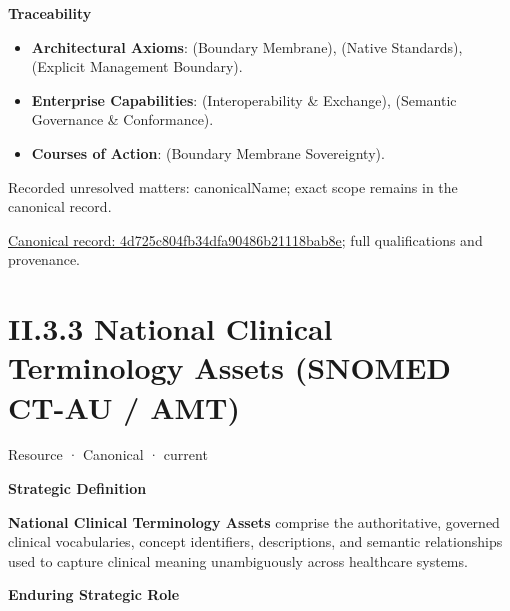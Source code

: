 \par\medskip\textbf{Traceability}\par


\begin{itemize}


\item \textbf{Architectural Axioms}: \texttt{} (Boundary Membrane), \texttt{} (Native Standards), \texttt{} (Explicit Management Boundary).

\item \textbf{Enterprise Capabilities}: \texttt{} (Interoperability \& Exchange), \texttt{} (Semantic Governance \& Conformance).

\item \textbf{Courses of Action}: \texttt{} (Boundary Membrane Sovereignty).

\end{itemize}

{\small Recorded unresolved matters: canonicalName; exact scope remains in the canonical record.}\par
{\footnotesize \href{../../../../../../../continuum/strategy/resource/4d725c804fb34dfa90486b21118bab8e.md}{Canonical record: 4d725c804fb34dfa90486b21118bab8e}; full qualifications and provenance.}\par
\section*{II.3.3 National Clinical Terminology Assets (SNOMED CT-AU / AMT)}
\label{navigation:II.3.3}

\label{element:430f641e40aa4bd4a8e85a5cbc1f93be}
{\small Resource · Canonical · current}\par

\par\medskip\textbf{Strategic Definition}\par


\textbf{National Clinical Terminology Assets} comprise the authoritative, governed clinical vocabularies, concept identifiers, descriptions, and semantic relationships used to capture clinical meaning unambiguously across healthcare systems.



\par\medskip\textbf{Enduring Strategic Role}\par


